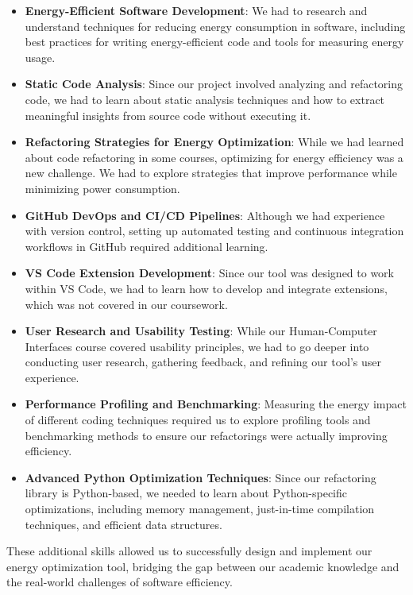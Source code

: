\documentclass{article}
\begin{document}
\begin{itemize}
    \item \textbf{Energy-Efficient Software Development}: We had to research and understand techniques 
    for reducing energy consumption in software, including best practices for writing energy-efficient 
    code and tools for measuring energy usage.
    
    \item \textbf{Static Code Analysis}: Since our project involved analyzing and refactoring code, 
    we had to learn about static analysis techniques and how to extract meaningful insights from 
    source code without executing it.
    
    \item \textbf{Refactoring Strategies for Energy Optimization}: While we had learned about code 
    refactoring in some courses, optimizing for energy efficiency was a new challenge. We had to 
    explore strategies that improve performance while minimizing power consumption.
    
    \item \textbf{GitHub DevOps and CI/CD Pipelines}: Although we had experience with version control,
    setting up automated testing and continuous integration workflows in GitHub required additional 
    learning.
    
    \item \textbf{VS Code Extension Development}: Since our tool was designed to work within VS Code, 
    we had to learn how to develop and integrate extensions, which was not covered in our coursework.
    
    \item \textbf{User Research and Usability Testing}: While our Human-Computer Interfaces course 
    covered usability principles, we had to go deeper into conducting user research, gathering 
    feedback, and refining our tool's user experience.
    
    \item \textbf{Performance Profiling and Benchmarking}: Measuring the energy impact of different 
    coding techniques required us to explore profiling tools and benchmarking methods to ensure our 
    refactorings were actually improving efficiency.
    
    \item \textbf{Advanced Python Optimization Techniques}: Since our refactoring library is 
    Python-based, we needed to learn about Python-specific optimizations, including memory management, 
    just-in-time compilation techniques, and efficient data structures.
\end{itemize}

These additional skills allowed us to successfully design and implement our energy optimization tool, 
bridging the gap between our academic knowledge and the real-world challenges of software efficiency. 
\end{document}
